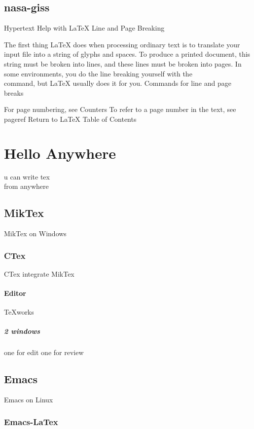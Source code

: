 \documentclass[a4paper,11pt]{book} %
\begin{document}
\begin{comment}
so, so
you think
you can tell
heaven from hell
\end{comment}

\subsection{nasa-giss}
Hypertext Help with LaTeX
Line and Page Breaking

The first thing LaTeX does when processing ordinary text is to translate your input file into a string of glyphs and spaces. To produce a printed document, this string must be broken into lines, and these lines must be broken into pages. In some environments, you do the line breaking yourself with the \\ command, but LaTeX usually does it for you.
Commands for line and page breaks
%
%

For page numbering, see Counters
To refer to a page number in the text, see \newline pageref
Return to LaTeX Table of Contents

\section{Hello Anywhere} u can write tex\\ from anywhere
		\subsection{MikTex} MikTex on
Windows
			\subsubsection{CTex}CTex integrate MikTex
				\paragraph{Editor}TeXworks
					\subparagraph{2 windows}one for edit one for review
		\subsection{Emacs}Emacs on Linux
			\subsubsection{Emacs-LaTex}
\end{document}
